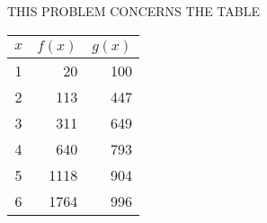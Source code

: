 \begin{problem}{0}
THIS PROBLEM CONCERNS THE TABLE

\begin{table}[h] 
\begin{center}
\addtolength{\tabcolsep}{4mm}
\renewcommand{\arraystretch}{1.2}
\begin{tabular}{|c|r|r|}
\hline
$x$ & \multicolumn{1}{|c|}{$f(x)$} & \multicolumn{1}{|c|}{$g(x)$} \\
\hline
\hline
1 & 20   & 100 \\
2 & 113  & 447 \\
3 & 311  & 649 \\
4 & 640  & 793 \\
5 & 1118 & 904 \\
6 & 1764 & 996 \\
\hline
\end{tabular}
\end{center}
\end{table}

\vfill
\end{problem}


\clearpage







\clearpage







\clearpage







\clearpage







\clearpage


